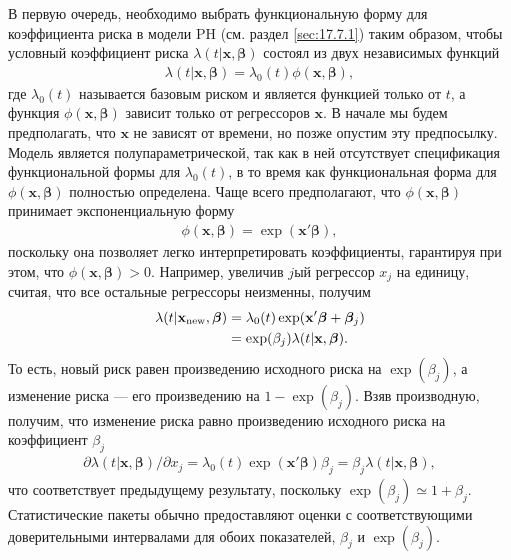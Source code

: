\noindent
В первую очередь, необходимо выбрать функциональную форму для коэффициента риска в модели PH (см. раздел \ref{sec:17.7.1}) таким образом, чтобы условный коэффициент риска $\lambda(t|\mathbf{x},\bm{\beta})$ состоял из двух независимых функций
        \begin{align}
        \label{eq:17.25}
        \lambda(t|\mathbf{x},\bm{\beta})=\lambda_0(t)\phi(\mathbf{x},\bm{\beta}),
        \end{align}
где $\lambda_0(t)$ называется базовым риском и является функцией только от $t$, а функция $\phi(\mathbf{x},\bm{\beta})$ зависит только от регрессоров $\mathbf{x}$. В начале мы будем предполагать, что $\mathbf{x}$ не зависят от времени, но позже опустим эту предпосылку. Модель является полупараметрической, так как в ней отсутствует спецификация функциональной формы для $\lambda_0(t)$, в то время как функциональная форма для $\phi(\mathbf{x},\bm{\beta})$ полностью определена. Чаще всего предполагают, что $\phi(\mathbf{x},\bm{\beta})$ принимает экспоненциальную форму
        \begin{align}
        \label{eq:17.26}
        \phi(\mathbf{x},\bm{\beta})=\exp(\mathbf{x}'\bm{\beta}),
        \end{align}
поскольку она позволяет легко интерпретировать коэффициенты, гарантируя при этом, что $\phi(\mathbf{x},\bm{\beta})>0$. Например, увеличив $j$ый регрессор $x_j$ на единицу, считая, что все остальные регрессоры неизменны, получим
        \begin{align}
        \label{eq:17.27}
        \lambda(t|\mathbf{x}_{\textrm{new}},\bm{\beta})&=\lambda_0(t)\exp(\mathbf{x}'\bm{\beta}+\bm{\beta}_j)\\
        &=\exp(\beta_j)\lambda(t|\mathbf{x},\bm{\beta}).\notag
        \end{align}
То есть, новый риск равен произведению исходного риска на $\exp(\beta_j)$, а изменение риска --- его произведению на $1-\exp(\beta_j)$. Взяв производную, получим, что изменение риска равно произведению исходного риска на коэффициент $\beta_j$
        \begin{align}
        \label{eq:17.28}
        \partial\lambda(t|\mathbf{x},\bm{\beta})/\partial x_j=\lambda_0(t)\exp(\mathbf{x}'\bm{\beta})\beta_j=\beta_j\lambda(t|\mathbf{x},\bm{\beta}),
        \end{align}
что соответствует предыдущему результату, поскольку $\exp(\beta_j)\simeq1+\beta_j$. Статистические пакеты обычно предоставляют оценки с соответствующими доверительными интервалами для обоих показателей, $\beta_j$ и $\exp(\beta_j)$.

